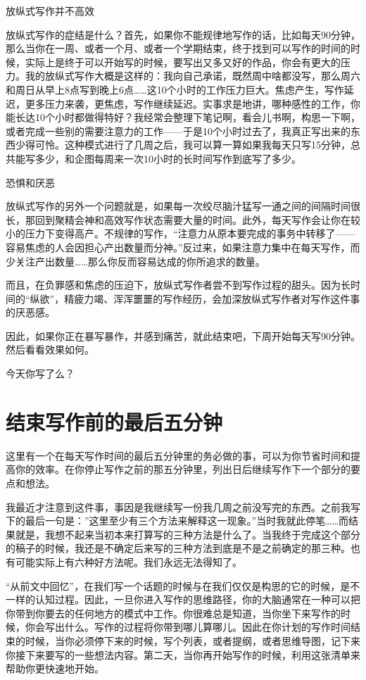\documentclass[12pt]{ctexart}
\begin{document}
放纵式写作并不高效

放纵式写作的症结是什么？首先，如果你不能规律地写作的话，比如每天90分钟，那么当你在一周、或者一个月、或者一个学期结束，终于找到可以写作的时间的时候，实际上是终于可以开始写的时候，要写出又多又好的作品，你会有更大的压力。我的放纵式写作大概是这样的：我向自己承诺，既然周中啥都没写，那么周六和周日从早上8点写到晚上6点……这10个小时的工作压力巨大。焦虑产生，写作延迟，更多压力来袭，更焦虑，写作继续延迟。实事求是地讲，哪种感性的工作，你能长达10个小时都做得特好？我经常会整理下笔记啊，看会儿书啊，构思一下啊，或者完成一些别的需要注意力的工作——于是10个小时过去了，我真正写出来的东西少得可怜。这种模式进行了几周之后，我可以算一算如果我每天只写15分钟，总共能写多少，和企图每周来一次10小时的长时间写作到底写了多少。

恐惧和厌恶

放纵式写作的另外一个问题就是，如果每一次绞尽脑汁猛写一通之间的间隔时间很长，那回到聚精会神和高效写作状态需要大量的时间。此外，每天写作会让你在较小的压力下变得高产。不规律的写作，“注意力从原本要完成的事务中转移了——容易焦虑的人会因担心产出数量而分神。”反过来，如果注意力集中在每天写作，而少关注产出数量……那么你反而容易达成的你所追求的数量。

而且，在负罪感和焦虑的压迫下，放纵式写作者尝不到写作过程的甜头。因为长时间的“纵欲”，精疲力竭、浑浑噩噩的写作经历，会加深放纵式写作者对写作这件事的厌恶感。

因此，如果你正在暴写暴作，并感到痛苦，就此结束吧，下周开始每天写90分钟。然后看看效果如何。

今天你写了么？

\section{结束写作前的最后五分钟}

这里有一个在每天写作时间的最后五分钟里的务必做的事，可以为你节省时间和提高你的效率。在你停止写作之前的那五分钟里，列出日后继续写作下一个部分的要点和想法。

我最近才注意到这件事，事因是我继续写一份我几周之前没写完的东西。之前我写下的最后一句是：”这里至少有三个方法来解释这一现象。”当时我就此停笔……而结果就是，我想不起来当初本来打算写的三种方法是什么了。当我终于完成这个部分的稿子的时候，我还是不确定后来写的三种方法到底是不是之前确定的那三种。也有可能实际上有六种好方法呢。我们永远无法得知了。

“从前文中回忆”，在我们写一个话题的时候与在我们仅仅是构思的它的时候，是不一样的认知过程。因此，一旦你进入写作的思维路径，你的大脑通常在一种可以把你带到你要去的任何地方的模式中工作。你很难总是知道，当你坐下来写作的时候，你会写出什么。写作的过程将你带到哪儿算哪儿。因此在你计划的写作时间结束的时候，当你必须停下来的时候，写个列表，或者提纲，或者思维导图，记下来你接下来要写的一些想法内容。第二天，当你再开始写作的时候，利用这张清单来帮助你更快速地开始。
\end{document}
